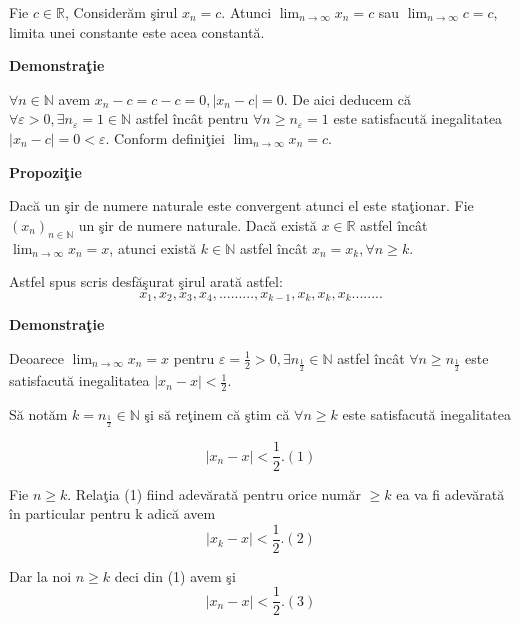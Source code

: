 \documentclass[a4paper,12pt,oneside]{report}
\begin{document}
Fie \(c \in \mathbb{R}\), Consider\u am \c sirul \(x_{n}=c\). Atunci \(\lim_{n \to \infty }x_{n}=c\) sau \(\lim_{n \to \infty }c=c\), limita unei constante este acea constant\u a. 

\textbf{Demonstra\c tie}

\(\forall n\in \mathbb{N}\) avem \(x_{n} - c = c - c = 0 , \left | x_{n}-c \right |= 0\). De aici deducem c\u a \(\forall \varepsilon > 0, \exists n_{\varepsilon} = 1 \in \mathbb{N}\) astfel \^ inc\^ at pentru \(\forall n\geq n_{\varepsilon }= 1\) este satisfacut\u a inegalitatea \(\left | x_{n}-c \right |= 0< \varepsilon\). 
	Conform defini\c tiei \(\lim_{n \to \infty }x_{n} = c. \)
	
\textbf{Propozi\c tie}

Dac\u a un \c sir de numere naturale este convergent atunci el este sta\c tionar. 
Fie \((x_{n})_{n\in \mathbb{N}}\) un \c sir de numere naturale. Dac\u a exist\u a \(x\in \mathbb{R}\) astfel \^ inc\^ at \(\lim_{n \to \infty }x_{n}= x\), atunci exist\u a \(k\in \mathbb{N}\) astfel \^ inc\^ at \(x_{n}= x_{k}, \forall n\geq k\).
	
Astfel spus scris desf\u a\c surat \c sirul arat\u a astfel:
\begin{displaymath}
x_{1},x_{2},x_{3},x_{4},.........,x_{k-1},x_{k},x_{k},x_{k}........
\end{displaymath}




\textbf{Demonstra\c tie}

Deoarece \(\lim_{n \to \infty }x_{n}= x\) pentru \(\varepsilon = \frac{1}{2}> 0, \exists n_{\frac{1}{2}}\in \mathbb{N}\) astfel \^ inc\^ at \(\forall n\geq n_{\frac{1}{2}}\) este satisfacut\u a inegalitatea \(\left | x_{n} -x \right |<  \frac{1}{2}\). 
	
S\u a not\u am \(k=n_{\frac{1}{2}}\in \mathbb{N}\) \c si s\u a re\c tinem c\u a \c stim c\u a \(\forall n\geq k \) este satisfacut\u a inegalitatea 

\begin{displaymath}
  \left | x_{n} -x \right |< \frac{1}{2}. (1) 
\end{displaymath}


Fie \(n\geq k\). Rela\c tia (1) fiind adev\u arat\u a pentru orice num\u ar \(\geq k\) ea va fi adev\u arat\u a \^ in particular pentru k adic\u a avem 
\begin{displaymath}
  \left | x_{k}-x \right |< \frac{1}{2}. (2)
\end{displaymath}


Dar la noi \(n\geq k\) deci din (1) avem \c si 
\begin{displaymath}
  \left | x_{n}-x \right |< \frac{1}{2}.(3)
\end{displaymath}
\end{document}

